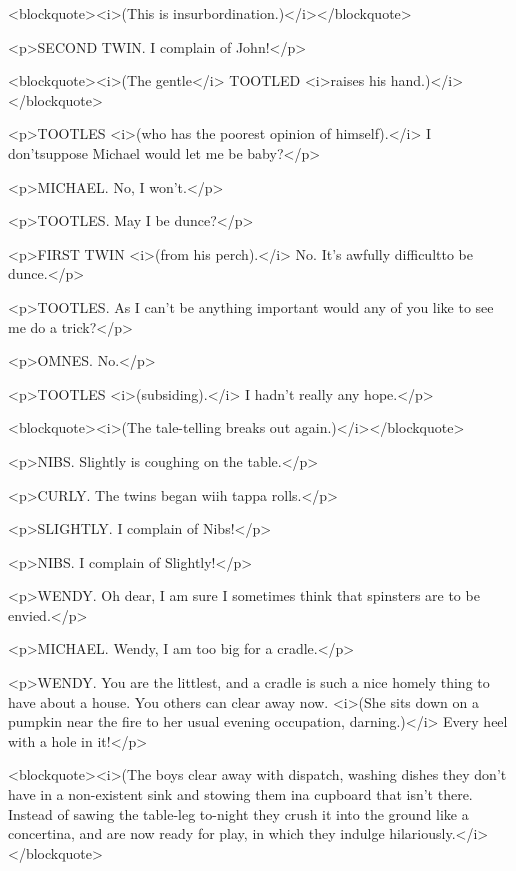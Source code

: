 <blockquote><i>(This is insurbordination.)</i></blockquote>

<p>SECOND TWIN. I complain of John!</p>

<blockquote><i>(The gentle</i> TOOTLED <i>raises his hand.)</i></blockquote>

<p>TOOTLES <i>(who has the poorest opinion of himself).</i> I don'tsuppose Michael would let me be baby?</p>

<p>MICHAEL. No, I won't.</p>

<p>TOOTLES. May I be dunce?</p>

<p>FIRST TWIN <i>(from his perch).</i> No. It's awfully difficultto be dunce.</p>

<p>TOOTLES. As I can't be anything important would any of you like to see me do a trick?</p>

<p>OMNES. No.</p>

<p>TOOTLES <i>(subsiding).</i> I hadn't really any hope.</p>

<blockquote><i>(The tale-telling breaks out again.)</i></blockquote>

<p>NIBS. Slightly is coughing on the table.</p>

<p>CURLY. The twins began wiih tappa rolls.</p>

<p>SLIGHTLY. I complain of Nibs!</p>

<p>NIBS. I complain of Slightly!</p>

<p>WENDY. Oh dear, I am sure I sometimes think that spinsters are to be envied.</p>

<p>MICHAEL. Wendy, I am too big for a cradle.</p>

<p>WENDY. You are the littlest, and a cradle is such a nice homely thing to have about a house. You others can clear away now. <i>(She sits down on a pumpkin near the fire to her usual evening occupation, darning.)</i> Every heel with a hole in it!</p>

<blockquote><i>(The boys clear away with dispatch, washing dishes they don't have in a non-existent sink and stowing them ina cupboard that isn't there. Instead of sawing the table-leg to-night they crush it into the ground like a concertina, and are now ready for play, in which they indulge hilariously.</i></blockquote>

